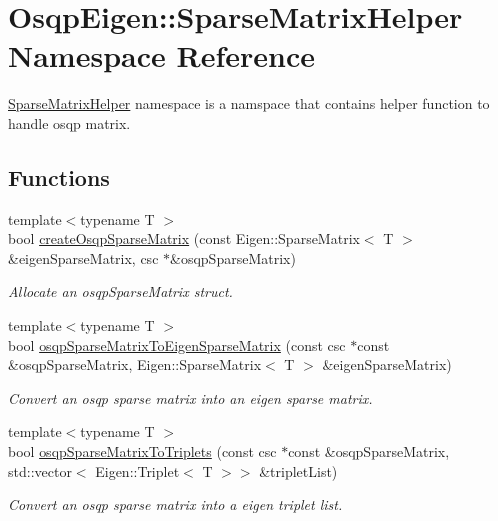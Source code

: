 \section{Osqp\+Eigen\+:\+:Sparse\+Matrix\+Helper Namespace Reference}
\label{namespaceOsqpEigen_1_1SparseMatrixHelper}


\mbox{\hyperlink{namespaceOsqpEigen_1_1SparseMatrixHelper}{Sparse\+Matrix\+Helper}} namespace is a namspace that contains helper function to handle osqp matrix.  


\subsection*{Functions}
\begin{DoxyCompactItemize}
\item 
{\footnotesize template$<$typename T $>$ }\\bool \mbox{\hyperlink{namespaceOsqpEigen_1_1SparseMatrixHelper_afd0b552419320e79e627e5d6c9e5715c}{create\+Osqp\+Sparse\+Matrix}} (const Eigen\+::\+Sparse\+Matrix$<$ T $>$ \&eigen\+Sparse\+Matrix, csc $\ast$\&osqp\+Sparse\+Matrix)
\begin{DoxyCompactList}\small\item\em Allocate an osqp\+Sparse\+Matrix struct. \end{DoxyCompactList}\item 
{\footnotesize template$<$typename T $>$ }\\bool \mbox{\hyperlink{namespaceOsqpEigen_1_1SparseMatrixHelper_aec1a2210ce843eda8e4000c81d886131}{osqp\+Sparse\+Matrix\+To\+Eigen\+Sparse\+Matrix}} (const csc $\ast$const \&osqp\+Sparse\+Matrix, Eigen\+::\+Sparse\+Matrix$<$ T $>$ \&eigen\+Sparse\+Matrix)
\begin{DoxyCompactList}\small\item\em Convert an osqp sparse matrix into an eigen sparse matrix. \end{DoxyCompactList}\item 
{\footnotesize template$<$typename T $>$ }\\bool \mbox{\hyperlink{namespaceOsqpEigen_1_1SparseMatrixHelper_af45a1d77519f691542150e506b6dcdeb}{osqp\+Sparse\+Matrix\+To\+Triplets}} (const csc $\ast$const \&osqp\+Sparse\+Matrix, std\+::vector$<$ Eigen\+::\+Triplet$<$ T $>$$>$ \&triplet\+List)
\begin{DoxyCompactList}\small\item\em Convert an osqp sparse matrix into a eigen triplet list. \end{DoxyCompactList}\item 
$$
\end{DoxyCompactItemize}
